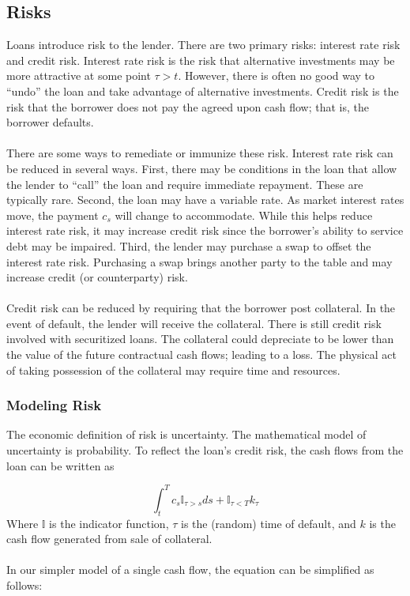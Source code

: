 \documentclass{article}
\theoremstyle{definition}
\begin{document}
\subsection{Risks}
Loans introduce risk to the lender.  There are two primary risks: interest rate risk and credit risk.  Interest rate risk is the risk that alternative investments may be more attractive at some point \(\tau>t\).  However, there is often no good way to ``undo'' the loan and take advantage of alternative investments.  Credit risk is the risk that the borrower does not pay the agreed upon cash flow; that is, the borrower defaults.  
\\
\\
There are some ways to remediate or immunize these risk.  Interest rate risk can be reduced in several ways.  First, there may be conditions in the loan that allow the lender to ``call'' the loan and require immediate repayment.  These are typically rare.  Second, the loan may have a variable rate.  As market interest rates move, the payment \(c_s\) will change to accommodate.  While this helps reduce interest rate risk, it may increase credit risk since the borrower's ability to service debt may be impaired.   Third, the lender may purchase a swap to offset the interest rate risk.  Purchasing a swap brings another party to the table and may increase credit (or counterparty) risk.  
\\
\\
Credit risk can be reduced by requiring that the borrower post collateral.  In the event of default, the lender will receive the collateral.  There is still credit risk involved with securitized loans.  The collateral could depreciate to be lower than the value of the future contractual cash flows; leading to a loss.  The physical act of taking possession of the collateral may require time and resources.  
\subsubsection{Modeling Risk}
The economic definition of risk is uncertainty.  The mathematical model of uncertainty is probability.  To reflect the loan's credit risk, the cash flows from the loan can be written as 

\begin{equation} \label{riskyCashFlows} 
\int_t ^ T c_s \mathbb{I}_{\tau>s} ds+\mathbb{I}_{\tau<T} k_\tau \end{equation}
Where \(\mathbb{I}\) is the indicator function, \(\tau\) is the (random) time of default, and \(k\) is the cash flow generated from sale of collateral.  
\\
\\
In our simpler model of a single cash flow, the equation can be simplified as follows:
\end{document}
